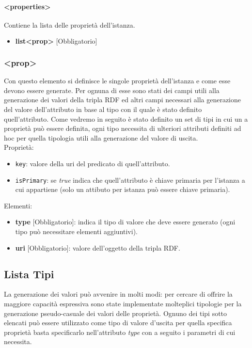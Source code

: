 \documentclass[12pt,a4paper,italian]{article}
\begin{document}
\paragraph{\large{<properties>}}
Contiene la lista delle proprietà dell'istanza.
\begin{itemize}
	\item \textbf{list<prop>} [Obbligatorio]
\end{itemize}

\subsubsection{\large{<prop>}}
Con questo elemento si definisce le singole proprietà dell'istanza e come esse devono essere generate. Per ognuna di esse sono stati dei campi utili alla generazione dei valori della tripla RDF 
ed altri campi necessari alla generazione del valore dell'attributo in base al tipo con il quale è stato definito quell'attributo. Come vedremo in seguito è stato definito un set di tipi in cui un a proprietà può essere
definita, ogni tipo necessita di ulteriori attributi definiti ad hoc per quella tipologia utili alla generazione del valore di uscita.\\
Proprietà:
\begin{itemize}
\item \texttt{key}: valore della uri del predicato di quell'attributo.
\item \texttt{isPrimary}: se \emph{true} indica che quell'attributo è chiave primaria per l'istanza a cui appartiene (solo un attibuto per istanza può essere chiave primaria).
\end{itemize}
Elementi:
\begin{itemize}
\item \textbf{type} [Obbligatorio]: indica il tipo di valore che deve essere generato (ogni tipo può necessitare elementi aggiuntivi).
\item \textbf{uri} [Obbligatorio]: valore dell'oggetto della tripla RDF.
\end{itemize}

\subsection{Lista Tipi}
La generazione dei valori può avvenire in molti modi: per cercare di offrire la maggiore capacità espressiva sono state implementate molteplici tipologie 
per la generazione pseudo-casuale dei valori delle proprietà.
Ognuno dei tipi sotto elencati può essere utilizzato come tipo di valore d'uscita per quella specifica proprietà basta specificarlo 
nell'attributo \emph{type} con a seguito i parametri di cui necessita.\\
\end{document}
